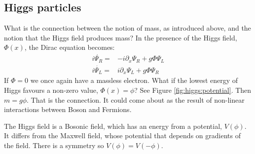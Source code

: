 \documentclass[]{article}
\begin{document}
\subsection{Higgs particles}

What is the connection between the notion of mass, as introduced above, and the notion that the Higgs field produces mass? In the presence of the Higgs field, $\Phi(x)$, the Dirac equation becomes:
\begin{align*}
	i \dot{\Psi_R} =& -i \partial_x \Psi_R + g \Phi \Psi_L\\
	i \dot{\Psi_L} =& i \partial_x \Psi_L + g \Phi \Psi_R
\end{align*}
If $\Phi=0$ we once again have a massless electron. What if the lowest energy of Higgs favours a non-zero value, $\Phi(x)=\phi$? See Figure \ref{fig:higgs:potential}. Then $m=g\phi$. That is the connection. It could come about as the result of non-linear interactions between Boson and Fermions.

The Higgs field is a Bosonic field, which has an energy from a potential, $V(\phi)$.  It differs from the Maxwell field, whose potential that depends on gradients of the field. There is a symmetry so $V(\phi)=V(-\phi)$.
\end{document}
